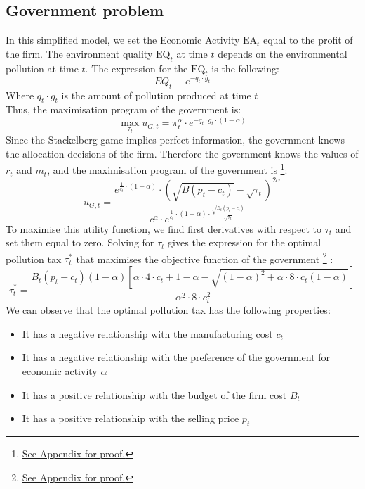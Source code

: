 \documentclass{article}
\begin{document}
\subsection{Government problem}
In this simplified model, we set the Economic Activity $\text{EA}_{t}$ equal to the profit of the firm.
The environment quality $\text{EQ}_{t}$ at time $t$ depends on the environmental pollution at time $t$. The expression for the $\text{EQ}_{t}$ is the following: 
\begin{equation}
    EQ_{t}\equiv e^{-q_{t}\cdot g_{t}}
\end{equation}
Where $q_{t}\cdot g_{t}$ is the amount of pollution produced at time $t$ \\
Thus, the maximisation program of the government is: 
\begin{equation*}
    \max_{\tau_{t}}{u_{G,t}=\pi_{t}^{\alpha}\cdot e^{-q_{t}\cdot g_{t}\cdot(1-\alpha)}}
\end{equation*}
Since the Stackelberg game implies perfect information, the government knows the allocation decisions of the firm. Therefore  the government knows the values of $r_{t}$ and $m_{t}$, and the maximisation program of the government is \footnote{\hyperref[sec:proof6]{See Appendix for proof.}}: 
\begin{equation}
    u_{G,t}=\frac{e^{\frac{1}{c_{t}}\cdot\left(1-\alpha\right)}\cdot\left(\sqrt{B(p_{t}-c_{t})}-\sqrt{\tau_{t}}\right)^{2\alpha}}{c^{\alpha}\cdot e^{\frac{1}{c_{t}}\cdot(1-\alpha)\cdot\frac{\sqrt{B_{t}(p_{t}-c_{t})}}{\sqrt{\tau_{t}}}}}
\end{equation}
To maximise this utility function, we find first derivatives with respect to $\tau_{t}$ and set them equal to zero. Solving for $\tau_{t}$ gives the expression for the optimal pollution tax $\tau_{t}^{*}$ that maximises the objective function of the government \footnote{\hyperref[sec:proof7]{See Appendix for proof.}} : 
\begin{equation}
    \tau_{t}^{*}=\frac{B_{t}\left(p_{t}-c_{t}\right)(1-\alpha)\left[{\alpha \cdot 4\cdot c_{t}+1-\alpha}-\sqrt{(1-\alpha)^{2}+\alpha\cdot8\cdot c_{t}(1-\alpha)}\right]} {\alpha^{2} \cdot 8\cdot c_{t}^{2}}
\end{equation}
We can observe that the optimal pollution tax has the following properties: 
\begin{itemize}
    \item It has a negative relationship with the manufacturing cost $c_{t}$
    \item It has a negative relationship with the preference of the government for economic activity $\alpha$
    \item It has a positive relationship with the budget of the firm cost $B_{t}$
    \item It has a positive relationship with the selling price $p_{t}$
\end{itemize}
\end{document}
